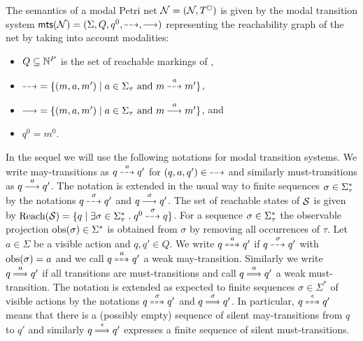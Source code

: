The semantics of a modal Petri net $\mpndef$ is given by the modal transition system
$\mts(\pnN) =  (\Sigma, Q, q^0, \may{},\must{})$  representing the reachability graph of the net by taking into account modalities:
\begin{itemize}
	\item $Q \subseteq \N^P$ is the set of reachable markings of \pnN,
	\item $\may{} \; = \{(m, a, m') \mid a \in \Sigmat \text{ and } m \may{a} m'\}$,
	\item $\must{} \; = \{(m, a, m') \mid a \in \Sigmat \text{ and } m \must{a} m'\}$, and
	\item $q^0 = m^0$.
\end{itemize}

In the sequel we will use the following notations for modal transition systems.
We write may-transitions as $q \may{a} q'$ for $(q,a,q') \in \;\may{}$ and similarly must-transitions as $q \must{a} q'$. %
The notation is extended in the usual way to finite sequences  $\sigma \in \Sigmat^*$ by the notations
$q \may{\sigma} q'$ and $q \must{\sigma} q'$.
The set of reachable states of $\S$ is given by $\reach(\S) = \{q \mid \exists \sigma \in \Sigmat^* \;.\; q^0 \may{\sigma} q\}$.
For a sequence $\sigma \in \Sigmat^*$ the observable projection $\obsa(\sigma) \in \Sigma^*$ is obtained from $\sigma$ by removing
all occurrences of $\tau$.   
Let $a \in \Sigma$ be a visible action and $q,q' \in Q$.
We write $q \mayw{a} q'$ if $q \may{\sigma} q'$ with  $\obsa(\sigma) = a$ and we call $q \mayw{a} q'$ a weak may-transition.
Similarly we write $q \mustw{a} q'$ if all transitions are must-transitions and call $q \mustw{a} q'$ a weak must-transition.
The notation is extended as expected to finite sequences $\sigma \in \Sigma^*$ of visible actions
by the notations $q \mayw{\sigma} q'$ and $q \mustw{\sigma} q'$.
In particular, $q \mayw{\epsilon} q'$ means that there is a (possibly empty) sequence of silent may-transitions from $q$ to $q'$
and  similarly $q\mustw{\epsilon}q'$ expresses a finite sequence of silent must-transitions.


